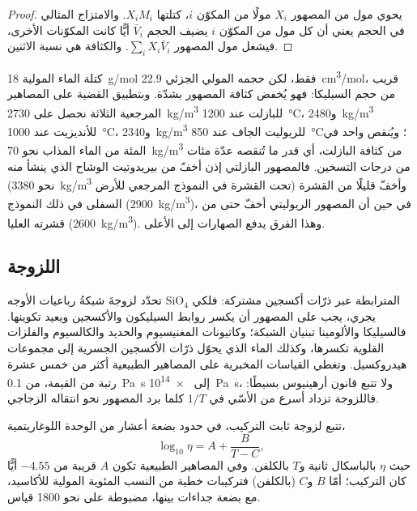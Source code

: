 \begin{proof}
يحوي مول من المصهور $X_i$ مولًا من المكوّن $i$، كتلتها $X_iM_i$. والامتزاج
المثالي في الحجم يعني أن كل مول من المكوّن $i$ يضيف الحجم $\bar V_i$
أيًّا كانت المكوّنات الأخرى، فيشغل مول المصهور $\sum_i X_i\bar V_i$.
والكثافة هي نسبة الاثنين.
\end{proof}

كتلة الماء المولية \qty{18}{g/mol} فقط، لكن حجمه المولي الجزئي
\qty{22.9}{cm^3/mol}، قريب من حجم السيليكا: فهو يُخفض كثافة المصهور
بشدّة. وبتطبيق القضية على المصاهير المرجعية الثلاثة نحصل على
\qty{2730}{kg/m^3} للبازلت عند \qty{1200}{\celsius}، و\qty{2480}{kg/m^3}
للأنديزيت عند \qty{1000}{\celsius}، و\qty{2340}{kg/m^3} للريوليت الجاف
عند \qty{850}{\celsius}؛ ويُنقص واحد في المئة من الماء المذاب نحو
\qty{70}{kg/m^3} من كثافة البازلت، أي قدر ما تُنقصه عدّة مئات من درجات التسخين.
فالمصهور البازلتي إذن أخفّ من بيريدوتيت الوشاح الذي ينشأ منه
(نحو \qty{3380}{kg/m^3} تحت القشرة في النموذج المرجعي للأرض) وأخفّ
قليلًا من القشرة السفلى في ذلك النموذج (\qty{2900}{kg/m^3})، في حين أن
المصهور الريوليتي أخفّ حتى من قشرته العليا (\qty{2600}{kg/m^3}). وهذا الفرق يدفع الصهارات
إلى الأعلى.

\subsection{اللزوجة}

تحدّد لزوجةَ  شبكةُ رباعيات الأوجه SiO$_4$
المترابطة عبر ذرّات أكسجين مشتركة: فلكي يجري، يجب على المصهور أن يكسر روابط
السيليكون والأكسجين ويعيد تكوينها. فالسيليكا والألومينا تبنيان الشبكة؛ وكاتيونات
المغنيسيوم والحديد والكالسيوم والفلزات القلوية تكسرها، وكذلك الماء الذي
يحوّل ذرّات الأكسجين الجسرية إلى مجموعات هيدروكسيل. وتغطي القياسات المخبرية على
المصاهير الطبيعية أكثر من خمس عشرة رتبة من القيمة، من \qty{0.1}{Pa.s} إلى
\qty{e14}{Pa.s}، ولا تتبع قانون أرهينيوس بسيطًا: فاللزوجة
تزداد أسرع من الأسّي في $1/T$ كلما برد المصهور نحو انتقاله
الزجاجي.

\begin{proposition}\label{prop:b2:magma-emplacement:vft}
تتبع لزوجة  ثابت التركيب، في حدود بضعة
أعشار من الوحدة اللوغاريتمية،
\[
\log_{10}\eta = A + \frac{B}{T - C},
\]
حيث $\eta$ بالباسكال ثانية و$T$ بالكلفن. وفي المصاهير الطبيعية تكون $A$ قريبة
من $-4.55$ أيًّا كان التركيب؛ أمّا $B$ و$C$ (بالكلفن) فتركيبات خطية
من النسب المئوية المولية للأكاسيد، مع بضعة جداءات بينها،
مضبوطة على نحو \num{1800} قياس.
\end{proposition}
\admitted

